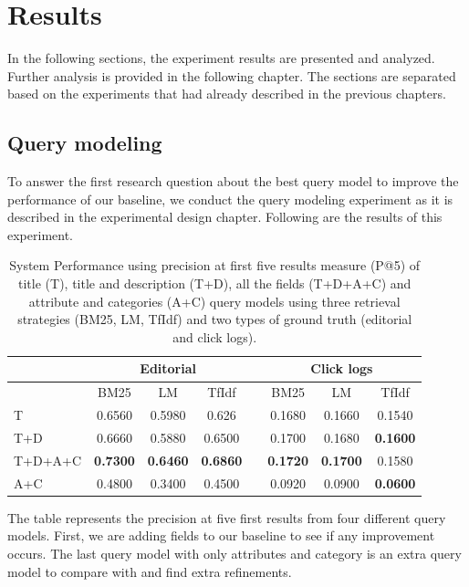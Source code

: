 \chapter{Results}

In the following sections, the experiment results are presented and analyzed. Further analysis is provided in the following chapter. The sections are separated based on the experiments that had already described in the previous chapters.

\section{Query modeling}

To answer the first research question about the best query model to improve the performance of our baseline, we conduct the query modeling experiment as it is described in the experimental design chapter. Following are the results of this experiment.

\begin{table}[H]
\begin{center}
\caption{System Performance using precision at first five results measure (P@5) of title (T), title and description (T+D), all the fields (T+D+A+C) and attribute and categories (A+C) query models using three retrieval strategies (BM25, LM, TfIdf) and two types of ground truth (editorial and click logs).}

\begin{tabular}{lccccccc}
\toprule
 & \multicolumn{3}{c}{Editorial} & & \multicolumn{3}{c}{Click logs} \\
\midrule
& BM25 & LM & TfIdf &   & BM25 & LM & TfIdf \\
\midrule
T & 0.6560 &  0.5980 & 0.626 &   &         		0.1680 & 0.1660 & 0.1540 \\
T+D & 0.6660 & 0.5880 & 0.6500 &   &    			0.1700 & 0.1680 & \textbf{0.1600} \\
T+D+A+C & \textbf{0.7300} & \textbf{0.6460} & \textbf{0.6860} &   & \textbf{0.1720} & \textbf{0.1700} & 0.1580 \\
A+C & 0.4800 & 0.3400 & 0.4500 &   &     			0.0920 & 0.0900 & \textbf{0.0600} \\
\bottomrule
\end{tabular}
\end{center}
\end{table}

The table represents the precision at five first results from four different query models. First, we are adding fields to our baseline to see if any improvement occurs. The last query model with only attributes and category is an extra query model to compare with and find extra refinements.

